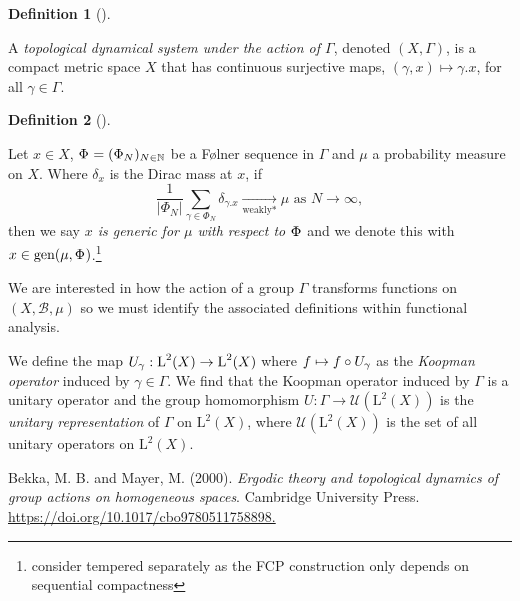\documentclass[
  british,
]{article}
\newlength{\cslhangindent}
\newenvironment{CSLReferences}[2] %
 {\begin{list}{}{%
  \setlength{\itemindent}{0pt}
  \setlength{\leftmargin}{0pt}
  \setlength{\parsep}{0pt}
  \ifodd #1
   \setlength{\leftmargin}{\cslhangindent}
   \setlength{\itemindent}{-1\cslhangindent}
  \fi
  \setlength{\itemsep}{#2\baselineskip}}}
 {\end{list}}
\theoremstyle{definition}
\newtheorem{definition}{Definition}[section]
\theoremstyle{remark}
\newcommand{\Measure}{{\mu}}
\newcommand{\GroupElement}{{\gamma}}
\newcommand{\Folner}[1][\vphantom{}]{{\Phi}_{#1}}
\newcommand{\GroupAction}[2]{{#1}.{#2}}
\newcommand{\Group}{{\Gamma}}
\newcommand{\SigmaAlgebra}[1]{{\mathscr{#1}}}
\begin{document}
\begin{definition}[]\protect\hypertarget{def-topologicalDynamicalSystem}{}\label{def-topologicalDynamicalSystem}

A \emph{topological dynamical system under the action of \(\Group\)},
denoted \((X,\Group)\), is a compact metric space \(X\) that has
continuous surjective maps,
\((\GroupElement,x)\mapsto \GroupAction{\GroupElement}{x}\), for all
\(\GroupElement\in\Group\).

\end{definition}

\begin{definition}[]\protect\hypertarget{def-generic}{}\label{def-generic}

Let \(x\in X\), \(\Folner=(\Folner[N])_{N\in\mathbb{N}}\) be a Følner
sequence in \(\Gamma\) and \(\Measure\) a probability measure on \(X\).
Where \(\delta_x\) is the Dirac mass at \(x\), if
\[\frac{1}{|\Folner[N]|}\sum_{\GroupElement\in\Folner[N]}\delta_{\GroupAction{\GroupElement}{x}}\underset{\text{weakly*}}{\longrightarrow} \Measure \text{ as }N\rightarrow\infty, \]
then we say \emph{\(x\) is generic for \(\Measure\) with respect to
\(\Folner\)} and we denote this with
\(x\in\text{gen}(\Measure,\Folner)\).\footnote{consider tempered
  separately as the FCP construction only depends on sequential
  compactness}

\end{definition}

We are interested in how the action of a group \(\Group\) transforms
functions on \((X,\SigmaAlgebra{B},\Measure)\) so we must identify the
associated definitions within functional analysis.

We define the map
\(\KoopmanOperator:\text{L}^2(X)\rightarrow\text{L}^2(X)\) where
\(f\mapsto f\circ \KoopmanOperator\) as the \emph{Koopman operator}
induced by \(\GroupElement\in\Group\). We find that the Koopman operator
induced by \(\Group\) is a unitary operator and the group homomorphism
\(U:\Group\rightarrow\mathscr{U}(\text{L}^2(X))\) is the \emph{unitary
representation} of \(\Group\) on \(\text{L}^2(X)\), where
\(\mathscr{U}(\text{L}^2(X))\) is the set of all unitary operators on
\(\text{L}^2(X)\).

\label{refs}
\begin{CSLReferences}{1}{0}
Bekka, M. B. and Mayer, M. (2000). \emph{Ergodic theory and topological
dynamics of group actions on homogeneous spaces}. Cambridge University
Press.
\href{https://doi.org/10.1017/cbo9780511758898}{https://doi.org/10.1017/cbo9780511758898.}

\end{CSLReferences}
\end{document}
